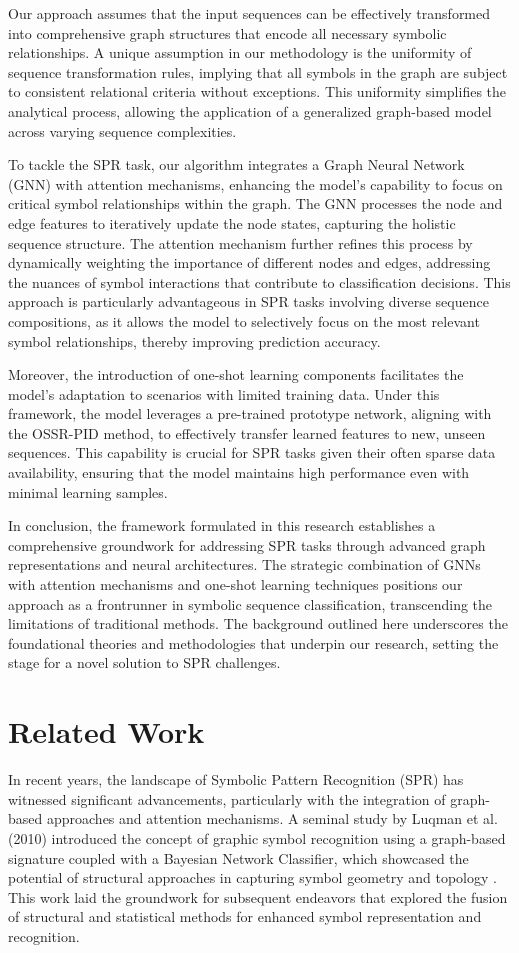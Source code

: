 \documentclass{article}
\begin{document}
Our approach assumes that the input sequences can be effectively transformed into comprehensive graph structures that encode all necessary symbolic relationships. A unique assumption in our methodology is the uniformity of sequence transformation rules, implying that all symbols in the graph are subject to consistent relational criteria without exceptions. This uniformity simplifies the analytical process, allowing the application of a generalized graph-based model across varying sequence complexities.

To tackle the SPR task, our algorithm integrates a Graph Neural Network (GNN) with attention mechanisms, enhancing the model's capability to focus on critical symbol relationships within the graph. The GNN processes the node and edge features to iteratively update the node states, capturing the holistic sequence structure. The attention mechanism further refines this process by dynamically weighting the importance of different nodes and edges, addressing the nuances of symbol interactions that contribute to classification decisions. This approach is particularly advantageous in SPR tasks involving diverse sequence compositions, as it allows the model to selectively focus on the most relevant symbol relationships, thereby improving prediction accuracy.

Moreover, the introduction of one-shot learning components facilitates the model's adaptation to scenarios with limited training data. Under this framework, the model leverages a pre-trained prototype network, aligning with the OSSR-PID method, to effectively transfer learned features to new, unseen sequences. This capability is crucial for SPR tasks given their often sparse data availability, ensuring that the model maintains high performance even with minimal learning samples.

In conclusion, the framework formulated in this research establishes a comprehensive groundwork for addressing SPR tasks through advanced graph representations and neural architectures. The strategic combination of GNNs with attention mechanisms and one-shot learning techniques positions our approach as a frontrunner in symbolic sequence classification, transcending the limitations of traditional methods. The background outlined here underscores the foundational theories and methodologies that underpin our research, setting the stage for a novel solution to SPR challenges.

\section{Related Work}
In recent years, the landscape of Symbolic Pattern Recognition (SPR) has witnessed significant advancements, particularly with the integration of graph-based approaches and attention mechanisms. A seminal study by Luqman et al. (2010) introduced the concept of graphic symbol recognition using a graph-based signature coupled with a Bayesian Network Classifier, which showcased the potential of structural approaches in capturing symbol geometry and topology \cite{arxiv:1004.5424v1}. This work laid the groundwork for subsequent endeavors that explored the fusion of structural and statistical methods for enhanced symbol representation and recognition.
\end{document}
